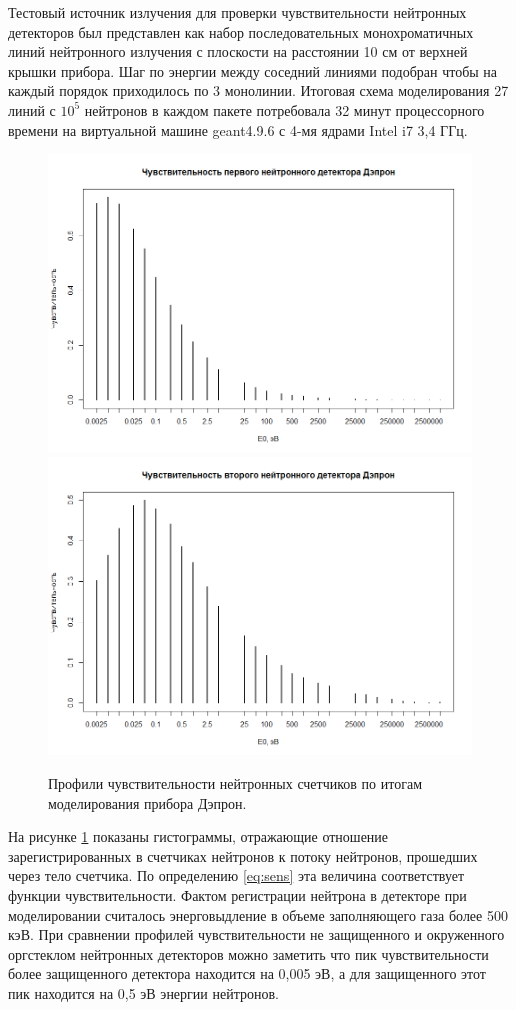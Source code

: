 Тестовый источник излучения для проверки чувствительности нейтронных детекторов был представлен как набор последовательных монохроматичных линий нейтронного излучения с плоскости на расстоянии 10 см от верхней крышки прибора. Шаг по энергии между соседний линиями подобран чтобы на каждый порядок приходилось по 3 монолинии.  
Итоговая схема моделирования 27 линий с $ 10^5 $ нейтронов в каждом пакете потребовала 32 минут процессорного времени на виртуальной машине geant4.9.6 с 4-мя ядрами Intel i7 3,4 ГГц.
\begin{figure}
	\centering
	\includegraphics[width=0.6\linewidth]{images/neutrons/nsens1}
	\includegraphics[width=0.6\linewidth]{images/neutrons/nsens2}
	\caption{Профили чувствительности нейтронных счетчиков по итогам моделирования прибора Дэпрон. }
	\label{fig:nsens1}
\end{figure}
На рисунке \ref{fig:nsens1} показаны гистограммы, отражающие отношение зарегистрированных в счетчиках нейтронов к потоку нейтронов, прошедших через тело счетчика. По определению \ref{eq:sens} эта величина соответствует функции чувствительности. Фактом регистрации нейтрона в детекторе при моделировании считалось энерговыдление в объеме заполняющего газа более 500 кэВ. 
При  сравнении профилей чувствительности не защищенного и окруженного оргстеклом нейтронных детекторов можно заметить что пик чувствительности более защищенного детектора находится на 0,005 эВ, а для защищенного этот пик находится на 0,5 эВ энергии нейтронов.

